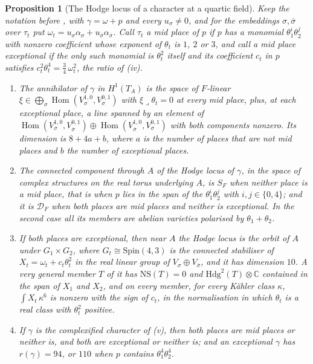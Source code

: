 \documentclass[11pt,reqno]{amsart}
\theoremstyle{plain}
\newtheorem{proposition}[theorem]{Proposition}
\theoremstyle{definition}
\theoremstyle{remark}
\newcommand{\CC}{\mathbb{C}}
\newcommand{\cD}{\mathcal{D}}
\newcommand{\Hdg}{\mathrm{Hdg}}
\newcommand{\NS}{\mathrm{NS}}
\DeclareMathOperator{\Hom}{Hom}
\newcommand{\bbar}[1]{\overline{#1}}
\begin{document}
\begin{proposition}[The Hodge locus of a character at a quartic field]
\label{prop:quarticlocus}
Keep the notation before , with $\gamma=\omega+p$ and
every $u_{\sigma}\ne0$, and for the embeddings $\sigma,\bbar\sigma$ over
$\tau_{t}$ put $\omega_{t}=u_{\sigma}\alpha_{\sigma}+u_{\bbar\sigma}
\alpha_{\bbar\sigma}$. Call $\tau_{t}$ a \emph{mid place} of $p$ if $p$ has a
monomial $\theta_{1}^{i}\theta_{2}^{j}$ with nonzero coefficient whose exponent
of $\theta_{t}$ is $1$, $2$ or $3$, and call a mid place \emph{exceptional} if
the only such monomial is $\theta_{t}^{2}$ itself and its coefficient $c_{t}$
in $p$ satisfies $c_{t}^{2}\theta_{t}^{4}=\frac34\,\omega_{t}^{2}$, the ratio
of (iv).
\begin{enumerate}[label=\textup{(\roman*)},leftmargin=2.6em,itemsep=2pt]
\item The annihilator of $\gamma$ in $H^{1}(T_{A})$ is the space of $F$-linear
  $\xi\in\bigoplus_{\sigma}\Hom(V_{\sigma}^{1,0},V_{\sigma}^{0,1})$ with
  $\xi\lrcorner\theta_{t}=0$ at every mid place, plus, at each exceptional
  place, a line spanned by an element of $\Hom(V_{\sigma}^{1,0},
  V_{\bbar\sigma}^{0,1})\oplus\Hom(V_{\bbar\sigma}^{1,0},V_{\sigma}^{0,1})$
  with both components nonzero. Its dimension is $8+4a+b$, where $a$ is the
  number of places that are not mid places and $b$ the number of exceptional
  places.
\item The connected component through $A$ of the Hodge locus of $\gamma$, in
  the space of complex structures on the real torus underlying $A$, is
  $S_{F}$ when neither place is a mid place, that is when $p$ lies in the
  span of the $\theta_{1}^{i}\theta_{2}^{j}$ with $i,j\in\{0,4\}$; and it is
  $\cD_{F}$ when both places are mid places and neither is exceptional. In
  the second case all its members are abelian varieties polarised by
  $\theta_{1}+\theta_{2}$.
\item If both places are exceptional, then near $A$ the Hodge locus is the
  orbit of $A$ under $G_{1}\times G_{2}$, where $G_{t}\cong\mathrm{Spin}(4,3)$
  is the connected stabiliser of $X_{t}=\omega_{t}+c_{t}\theta_{t}^{2}$ in the
  real linear group of $V_{\sigma}\oplus V_{\bbar\sigma}$, and it has
  dimension $10$. A very general member $T$ of it has $\NS(T)=0$ and
  $\Hdg^{2}(T)\otimes\CC$ contained in the span of $X_{1}$ and $X_{2}$, and on
  every member, for every K\"ahler class $\kappa$, $\int X_{t}\,\kappa^{6}$ is
  nonzero with the sign of $c_{t}$, in the normalisation in which
  $\theta_{t}$ is a real class with $\theta_{t}^{2}$ positive.
\item If $\gamma$ is the complexified character of (v),
  then both places are mid places or neither is, and both are exceptional or
  neither is; and an exceptional $\gamma$ has $r(\gamma)=94$, or $110$ when
  $p$ contains $\theta_{1}^{4}\theta_{2}^{4}$.
\end{enumerate}
\end{proposition}
\end{document}
